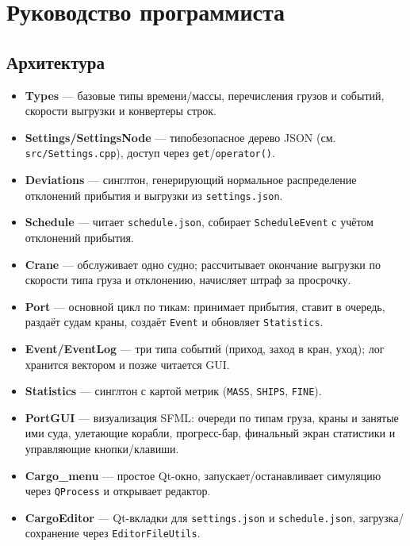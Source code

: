 \documentclass[12pt,a4paper]{article}
\begin{document}
\section{Руководство программиста}
\subsection{Архитектура}
\begin{itemize}[noitemsep]
    \item \textbf{Types} — базовые типы времени/массы, перечисления грузов и событий, скорости выгрузки и конвертеры строк.
    \item \textbf{Settings/SettingsNode} — типобезопасное дерево JSON (см. \verb|src/Settings.cpp|), доступ через \verb|get|/\verb|operator()|.
    \item \textbf{Deviations} — синглтон, генерирующий нормальное распределение отклонений прибытия и выгрузки из \verb|settings.json|.
    \item \textbf{Schedule} — читает \verb|schedule.json|, собирает \texttt{ScheduleEvent} с учётом отклонений прибытия.
    \item \textbf{Crane} — обслуживает одно судно; рассчитывает окончание выгрузки по скорости типа груза и отклонению, начисляет штраф за просрочку.
    \item \textbf{Port} — основной цикл по тикам: принимает прибытия, ставит в очередь, раздаёт судам краны, создаёт \texttt{Event} и обновляет \texttt{Statistics}.
    \item \textbf{Event/EventLog} — три типа событий (приход, заход в кран, уход); лог хранится вектором и позже читается GUI.
    \item \textbf{Statistics} — синглтон с картой метрик (\texttt{MASS}, \texttt{SHIPS}, \texttt{FINE}).
    \item \textbf{PortGUI} — визуализация SFML: очереди по типам груза, краны и занятые ими суда, улетающие корабли, прогресс-бар, финальный экран статистики и управляющие кнопки/клавиши.
    \item \textbf{Cargo\_menu} — простое Qt-окно, запускает/останавливает симуляцию через \texttt{QProcess} и открывает редактор.
    \item \textbf{CargoEditor} — Qt-вкладки для \verb|settings.json| и \verb|schedule.json|, загрузка/сохранение через \verb|EditorFileUtils|.
\end{itemize}
\end{document}
